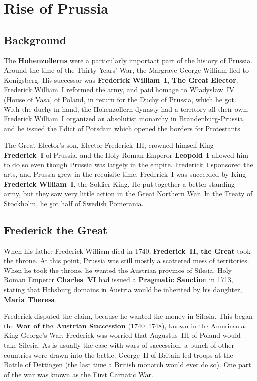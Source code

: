 \section{Rise of Prussia}

\subsection*{Background}

The \textbf{Hohenzollerns} were a particularly important part of the history of Prussia.
Around the time of the Thirty Years' War, the Margrave George William fled to Konigsberg.
His successor was \textbf{Frederick William~I, The Great Elector}.
Frederick William~I reformed the army, and paid homage to W\l{}adys\l{}aw~IV (House of Vasa) of Poland,
in return for the Duchy of Prussia, which he got.
With the duchy in hand, the Hohenzollern dynasty had a territory all their own.
Frederick William~I organized an absolutist monarchy in Brandenburg-Prussia,
and he issued the Edict of Potsdam which opened the borders for Protestants.

The Great Elector's son, Elector Frederick~III, crowned himself King \textbf{Frederick~I} of Prussia,
and the Holy Roman Emperor \textbf{Leopold~I} allowed him to do so even though Prussia was largely in the empire.
Frederick~I sponsored the arts, and Prussia grew in the requisite time.
Frederick~I was succeeded by King \textbf{Frederick William~I}, the Soldier King.
He put together a better standing army, but they saw very little action in the Great Northern War.
In the Treaty of Stockholm, he got half of Swedish Pomerania.

\subsection*{Frederick the Great}

When his father Frederick William died in 1740, \textbf{Frederick~II, the Great} took the throne.
At this point, Prussia was still mostly a scattered mess of territories.
When he took the throne, he wanted the Austrian province of Silesia.
Holy Roman Emperor \textbf{Charles~VI} had issued a \textbf{Pragmatic Sanction} in 1713,
stating that Habsburg domains in Austria would be inherited by his daughter, \textbf{Maria Theresa}.

Frederick disputed the claim, because he wanted the money in Silesia.
This began the \textbf{War of the Austrian Succession} (1740--1748),
known in the Americas as King George's War.
Frederick was worried that Augustus~III of Poland would take Silesia.
As is usually the case with wars of succession, a bunch of other countries were drawn into the battle.
George~II of Britain led troops at the Battle of Dettingen (the last time a British monarch would ever do so).
One part of the war was known as the First Carnatic War.

